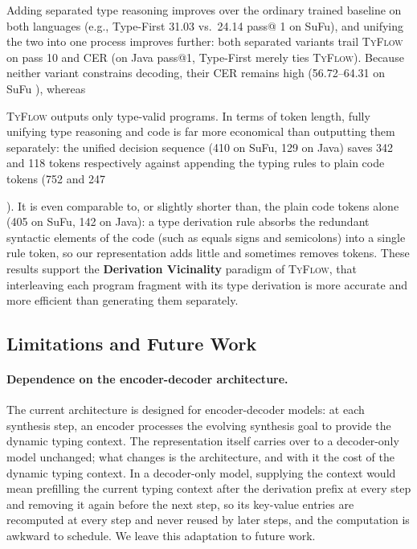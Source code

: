 \documentclass[manuscript,screen]{acmart}
\newcommand{\toolname}[1]{\textsc{#1}}
\newcommand{\mainname}{\toolname{TyFlow}\xspace}
\begin{document}
  {\color{revblue}Adding separated type reasoning improves over the ordinary trained baseline on both languages (e.g., Type-First 31.03 vs.\ 24.14 } pass@ {\color{revblue}1 on SuFu), and unifying the two into one process improves further: both separated variants trail }\mainname{} {\color{revblue}on pass} 10  %
 and    {\color{revblue}CER (on Java pass@1, Type-First merely ties }\mainname{}{\color{revblue}).
Because neither variant constrains decoding, their CER remains high (56.72--64.31 on SuFu} ), whereas  %

  \mainname{} {\color{revblue}outputs only type-valid programs.
In terms of token length, fully unifying type reasoning and code is far more economical than outputting them separately: the unified decision sequence (410 on SuFu, } 129    {\color{revblue}on Java) saves 342 and 118 tokens respectively against appending the typing rules to plain code tokens (752 and } 247 %

  {\color{revblue}).
It is even comparable to, or slightly shorter than, the plain code tokens alone (405 on SuFu, 142 on Java): a type derivation rule absorbs the redundant syntactic elements of the code (such as equals signs and semicolons) into a single rule token, so our representation adds little and sometimes removes tokens.
These results support the } \textbf{Derivation Vicinality}    {\color{revblue}paradigm of } \mainname   {\color{revblue}, that interleaving each program fragment with its type derivation is more accurate and more efficient than generating them separately.
} 

 \subsection{{\color{revblue}Limitations and Future Work}} \label{sec:limitations}
\paragraph{{\color{revblue}Dependence on the encoder-decoder architecture.}}
{\color{revblue}The current architecture is designed for encoder-decoder models: at each synthesis step, an encoder processes the evolving synthesis goal to provide the dynamic typing context.
The representation itself carries over to a decoder-only model unchanged; what changes is the architecture, and with it the cost of the dynamic typing context.
In a decoder-only model, supplying the context would mean prefilling the current typing context after the derivation prefix at every step and removing it again before the next step, so its key-value entries are recomputed at every step and never reused by later steps, and the computation is awkward to schedule.
We leave this adaptation to future work.
}
\end{document}

